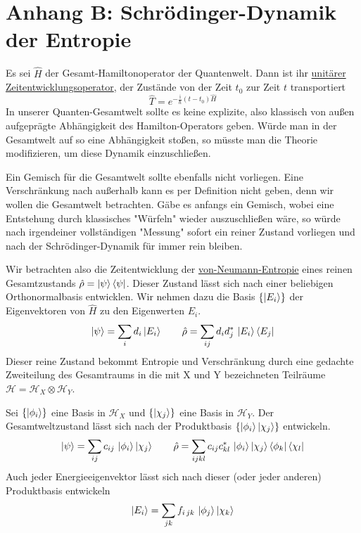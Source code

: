 \documentclass[12pt]{article}
\begin{document}
\section{Anhang B: Schrödinger-Dynamik der Entropie}

Es sei $\hat{H}$ der Gesamt-Hamiltonoperator der Quantenwelt. Dann ist ihr \href{https://de.wikipedia.org/wiki/Zeitentwicklungsoperator}{unitärer Zeitentwicklungsoperator}, der Zustände von der Zeit $t_0$ zur Zeit $t$ transportiert
\begin{equation}
\label{eq:propagator}
\hat{T}=e^{-\frac{\mathrm i}{\hbar}(t-t_0)\hat{H}}
\end{equation}
In unserer Quanten-Gesamtwelt sollte es keine explizite, also klassisch von außen aufgeprägte Abhängigkeit des Hamilton-Operators geben. Würde man in der Gesamtwelt auf so eine Abhängigkeit stoßen, so müsste man die Theorie modifizieren, um diese Dynamik einzuschließen.

Ein Gemisch für die Gesamtwelt sollte ebenfalls nicht vorliegen. Eine Verschränkung nach außerhalb kann es per Definition nicht geben, denn wir wollen die Gesamtwelt betrachten. Gäbe es anfangs ein Gemisch, wobei eine Entstehung durch klassisches "Würfeln" wieder auszuschließen wäre, so würde nach irgendeiner vollständigen "Messung" sofort ein reiner Zustand vorliegen und nach der Schrödinger-Dynamik für immer rein bleiben. 

Wir betrachten also die Zeitentwicklung der \href{https://de.wikipedia.org/wiki/Entropie#Von-Neumann-Entropie}{von-Neumann-Entropie} eines reinen Gesamtzustands $\hat{\rho}=\ket{\psi}\bra{\psi}$. Dieser Zustand lässt sich nach einer beliebigen Orthonormalbasis entwicklen. Wir nehmen dazu die Basis $\{\ket{E_i}\}$ der Eigenvektoren von $\hat{H}$ zu den Eigenwerten $E_i$.
\begin{equation}
\label{eq:psi_energy}
\ket{\psi}=\sum_{i}d_{i}\ket{E_i} \quad\quad
\hat{\rho}=\sum_{ij}d_{i}d_{j}^*\, \ket{E_i}\bra{E_j}
\end{equation}
Dieser reine Zustand bekommt Entropie und Verschränkung durch eine gedachte Zweiteilung des Gesamtraums in die mit X und Y bezeichneten Teilräume $\mathscr{H} = \mathscr{H}_X\otimes\mathscr{H}_Y$.

Sei $\{\ket{\phi_i}\}$ eine Basis in $\mathscr{H}_X$ und $\{\ket{\chi_j}\}$ eine Basis in $\mathscr{H}_Y$. Der Gesamtweltzustand lässt sich nach der Produktbasis $\{\ket{\phi_i}\ket{\chi_j}\}$ entwickeln.
\begin{equation}
\label{eq:psi_product}
\ket{\psi}=\sum_{ij}c_{ij}\, \ket{\phi_i}\ket{\chi_j} \quad\quad
\hat{\rho}=\sum_{ijkl}c_{ij}c_{kl}^*\, \ket{\phi_i}\ket{\chi_j}\bra{\phi_k}\bra{\chi_l}
\end{equation}
Auch jeder Energieeigenvektor lässt sich nach dieser (oder jeder anderen) Produktbasis entwickeln
\begin{equation}
\label{eq:energy_eigenvector}
\ket{E_i}=\sum_{jk}f_{i\,jk}\, \ket{\phi_j}\ket{\chi_k}
\end{equation}
\end{document}
